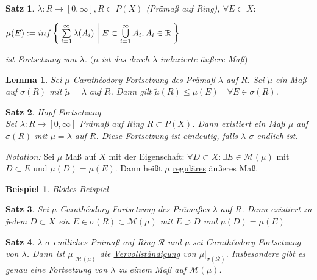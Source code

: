\documentclass[11pt]{memoir}
\theoremstyle{changebreak}
\newtheorem{Beispiel}{Beispiel}[chapter]
\newtheorem{Lemma}{Lemma}[chapter]
\newtheorem{Satz}{Satz}[chapter]
\newcommand{\cara}{Carathéodory-Fortsetzung}
\begin{document}
\begin{Satz}
$\lambda: R \rightarrow [0, \infty], {}R \subset P(X)$ (Prämaß auf Ring), $\forall {}E \subset X:$ \\
\begin{center}
$\mu(E):= inf\Set{ \sum\limits_{i=1}^{\infty} \lambda(A_i) | E \subset \bigcup\limits_{i=1}^{\infty} A_i, A_i \in \mathbb{R}}$
\end{center}
ist Fortsetzung von $\lambda$. $(\mu$ ist das durch $\lambda$ induzierte äußere Maß$)$
\end{Satz}

\begin{Lemma}
Sei $\mu$ \cara{} des Prämaß $\lambda$ auf $R$. Sei $\tilde{\mu}$ ein Maß auf $\sigma(R)$ mit $\tilde{\mu} = \lambda$ auf $R$. Dann gilt $\tilde{\mu}(R) \leq \mu(E)\quad \forall E \in \sigma(R)$.
\end{Lemma}

\begin{Satz} \emph{Hopf-Fortsetzung} \\
Sei $\lambda: R \rightarrow [0, \infty]$ Prämaß auf Ring $R \subset P(X)$. Dann existiert ein Maß $\mu$ auf $\sigma(R)$ mit $\mu =\lambda$ auf $R$. Diese Fortsetzung ist \underline{eindeutig}, falls $\lambda$ $\sigma$-endlich ist.
\end{Satz}

\emph{Notation:}
Sei $\mu$ Maß auf $X$ mit der Eigenschaft: $\forall D \subset X: \exists E \in \mathscr{M}(\mu)$ mit $D \subset E$ und $\mu(D) = \mu(E)$. Dann heißt $\mu$ \underline{reguläres} äußeres Maß.

\begin{Beispiel}
Blödes Beispiel
\end{Beispiel}

\begin{Satz}
Sei $\mu$ \cara{} des Prämaßes $\lambda$ auf $R$. Dann existiert zu jedem $D \subset X$ ein $E \in \sigma(R) \subset \mathscr M(\mu)$ mit $E \supset D$ und $\mu(D) = \mu(E)$
\end{Satz}

\begin{Satz}
$\lambda$  $\sigma$-endliches Prämaß auf Ring $\mathscr R$ und $\mu$ sei \cara{} von $\lambda$. Dann ist $\mu|_{\mathscr M(\mu)}$ die \underline{Vervollständigung} von $\mu|_{\sigma(\mathscr R)}$. Insbesondere gibt es genau eine Fortsetzung von $\lambda$ zu einem Maß auf $\mathscr M(\mu)$.
\end{Satz}
\end{document}
